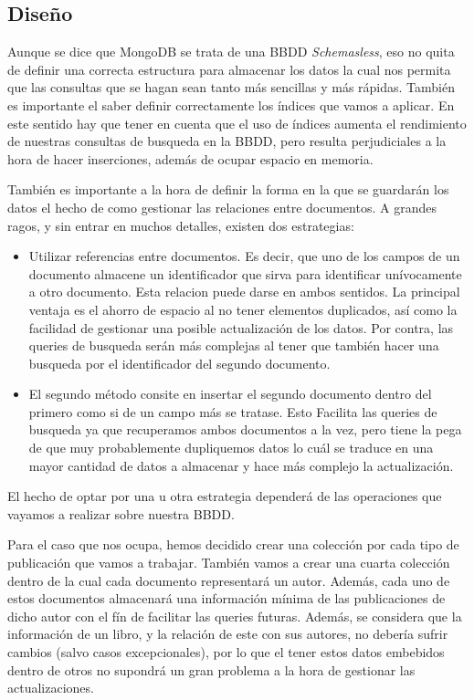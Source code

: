 \subsection{Diseño}

Aunque se dice que MongoDB se trata de una \gls{BBDD} \textit{Schemasless}, eso no quita de definir una correcta estructura para almacenar los datos la cual nos permita que las consultas que se hagan sean tanto más sencillas y más rápidas. También es importante el saber definir correctamente los índices que vamos a aplicar. En este sentido hay que tener en cuenta que el uso de índices aumenta el rendimiento de nuestras consultas de busqueda en la \gls{BBDD}, pero resulta perjudiciales a la hora de hacer inserciones, además de ocupar espacio en memoria.

También es importante a la hora de definir la forma en la que se guardarán los datos el hecho de como gestionar las relaciones entre documentos. A grandes ragos, y sin entrar en muchos detalles, existen dos estrategias:

\begin{itemize}
 \item Utilizar referencias entre documentos. Es decir, que uno de los campos de un documento almacene un identificador que sirva para identificar unívocamente a otro documento. Esta relacion puede darse en ambos sentidos. La principal ventaja es el ahorro de espacio al no tener elementos duplicados, así como la facilidad de gestionar una posible actualización de los datos. Por contra, las queries de busqueda serán más complejas al tener que también hacer una busqueda por el identificador del segundo documento.
 \item El segundo método consite en insertar el segundo documento dentro del primero como si de un campo más se tratase. Esto Facilita las queries de busqueda ya que recuperamos ambos documentos a la vez, pero tiene la pega de que muy probablemente dupliquemos datos lo cuál se traduce en una mayor cantidad de datos a almacenar y hace más complejo la actualización.
\end{itemize}

El hecho de optar por una u otra estrategia dependerá de las operaciones que vayamos a realizar sobre nuestra \gls{BBDD}. 

Para el caso que nos ocupa, hemos decidido crear una colección por cada tipo de publicación que vamos a trabajar. También vamos a crear una cuarta colección dentro de la cual cada documento representará un autor. Además, cada uno de estos documentos almacenará una información mínima de las publicaciones de dicho autor con el fín de facilitar las queries futuras. Además, se considera que la información de un libro, y la relación de este con sus autores, no debería sufrir cambios (salvo casos excepcionales), por lo que el tener estos datos embebidos dentro de otros no supondrá un gran problema a la hora de gestionar las actualizaciones.

